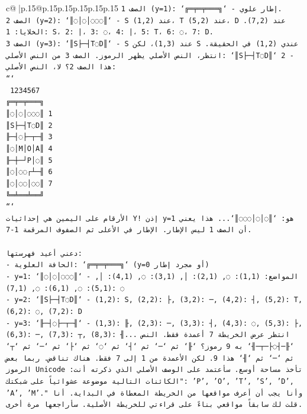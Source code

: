 \documentclass{article}
\begin{document}
{\begin{supertabular}{c@{$\;$}|p{.15\linewidth}@{}p{.15\linewidth}p{.15\linewidth}p{.15\linewidth}p{.15\linewidth}p{.15\linewidth}}
{{{\texttt{الصف 1 (y=1): `╔═╤═╤═══╗` {-} إطار علوي.} \\
\texttt{الصف 2 (y=2): `║◌│◌│◌◌◌║` {-} S عند (1,2)، T عند (5,2)، D عند (7,2). الخلايا: 1: S، 2: |، 3: ◌، 4: |، 5: T، 6: ◌، 7: D.} \\
\texttt{الصف 3 (y=3): `║S├─┤T◌D║` {-} S عند (1,3)، لكن S عندي (1,2) في الحقيقة. انتظر، النص الأصلي يظهر الرموز. الصف 3 من النص الأصلي: `║S├─┤T◌D║` 2 {-} هذا الصف 2؟ لا، النص الأصلي:} \\
\texttt{```} \\
\texttt{ 1234567} \\
\texttt{╔═╤═╤═══╗} \\
\texttt{║◌│◌│◌◌◌║ 1} \\
\texttt{║S├─┤T◌D║ 2} \\
\texttt{╟─┤◌├─┬─╢ 3} \\
\texttt{║◌│M│O│A║ 4} \\
\texttt{╟─┼─┘P│◌║ 5} \\
\texttt{║◌│◌◌┌┴─╢ 6} \\
\texttt{║◌│◌◌│◌◌║ 7} \\
\texttt{╚═╧══╧══╝} \\
\texttt{```} \\
\texttt{الأرقام على اليمين هي إحداثيات Y! إذن y=1 هو: `║◌│◌│◌◌◌║`... هذا يعني أن الصف 1 ليس الإطار. الإطار في الأعلى ثم الصفوف المرقمة 1{-}7.} \\
\\ 
\texttt{دعني أعيد فهرستها:} \\
\texttt{{-} الحافة العلوية: `╔═╤═╤═══╗` (y=0 أو مجرد إطار)} \\
\texttt{{-} y=1: `║◌│◌│◌◌◌║` {-} المواضع: (1,1): ◌, (2,1): │, (3,1): ◌, (4,1): │, (5,1): ◌, (6,1): ◌, (7,1): ◌} \\
\texttt{{-} y=2: `║S├─┤T◌D║` {-} (1,2): S, (2,2): ├, (3,2): ─, (4,2): ┤, (5,2): T, (6,2): ◌, (7,2): D} \\
\texttt{{-} y=3: `╟─┤◌├─┬─╢` {-} (1,3): ╟, (2,3): ─, (3,3): ┤, (4,3): ◌, (5,3): ├, (6,3): ─, (7,3): ┬, (8,3): ╢... انتظر عرض الخريطة 7 أعمدة فقط. النص `╟─┤◌├─┬─╢` به 9 رموز؟ `╟` ثم `─` ثم `┤` ثم `◌` ثم `├` ثم `─` ثم `┬` ثم `─` ثم `╢` هذا 9. لكن الأعمدة من 1 إلى 7 فقط. هناك تناقض. ربما بعض الرموز Unicode تأخذ مساحة أوسع. سأعتمد على الوصف الأصلي الذي ذكرته أنت: "الكائنات التالية موضوعة عشوائياً على شبكتك: 'P', 'O', 'T', 'S', 'D', 'A', 'M'." وأنا يجب أن أعرف مواقعها من الخريطة المعطاة في البداية. أنا قلت لك سابقاً مواقعي بناءً على قراءتي للخريطة الأصلية. سأراجعها مرة أخرى.} \\
\\ 
}}}
\end{supertabular}}
\end{document}
